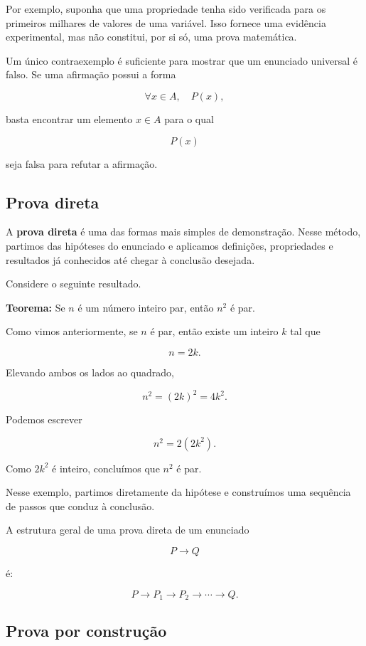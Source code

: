 \documentclass[
  brazilian,
  letterpaper,
]{book}
\theoremstyle{plain}
\theoremstyle{definition}
\theoremstyle{remark}
\begin{document}
Por exemplo, suponha que uma propriedade tenha sido verificada para os
primeiros milhares de valores de uma variável. Isso fornece uma
evidência experimental, mas não constitui, por si só, uma prova
matemática.

Um único contraexemplo é suficiente para mostrar que um enunciado
universal é falso. Se uma afirmação possui a forma

\[
\forall x\in A,\quad P(x),
\]

basta encontrar um elemento \(x\in A\) para o qual

\[
P(x)
\]

seja falsa para refutar a afirmação.

\subsection{Prova direta}\label{prova-direta}

A \textbf{prova direta} é uma das formas mais simples de demonstração.
Nesse método, partimos das hipóteses do enunciado e aplicamos
definições, propriedades e resultados já conhecidos até chegar à
conclusão desejada.

Considere o seguinte resultado.

\textbf{Teorema:} Se \(n\) é um número inteiro par, então \(n^2\) é par.

Como vimos anteriormente, se \(n\) é par, então existe um inteiro \(k\)
tal que

\[
n=2k.
\]

Elevando ambos os lados ao quadrado,

\[
n^2=(2k)^2=4k^2.
\]

Podemos escrever

\[
n^2=2(2k^2).
\]

Como \(2k^2\) é inteiro, concluímos que \(n^2\) é par.

Nesse exemplo, partimos diretamente da hipótese e construímos uma
sequência de passos que conduz à conclusão.

A estrutura geral de uma prova direta de um enunciado

\[
P\rightarrow Q
\]

é:

\[
P
\rightarrow
P_1
\rightarrow
P_2
\rightarrow
\cdots
\rightarrow
Q.
\]

\subsection{Prova por construção}\label{prova-por-construuxe7uxe3o}
\end{document}
